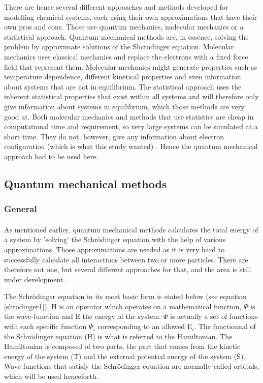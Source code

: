 \documentclass[12pt,a4paper]{article}
\begin{document}
There are hence several different approaches and methods developed for modelling chemical systems, each using their own approximations that have their own pros and cons. Those use quantum mechanics, molecular mechanics  or a statistical approach. Quantum mechanical methods are, in essence, solving the problem by approximate solutions of the Shcrödinger equation.  Molecular mechanics uses classical mechanics and replace the electrons with a fixed force field that represent  them. Molecular mechanics might generate properties such as temperature dependence, different kinetical properties and even information about systems that are not in equilibrium.  The statistical approach uses the inherent statistical properties that exist within all systems and will therefore only give information about systems in equilibrium, which those methods are very good at. Both molecular mechanics and methods that use statistics are cheap in computational time and requirement, so very large systems can be simulated at a short time. They do not, however, give any information about electron configuration (which is what this study wanted) \cite{computionalprimer}. Hence the quantum mechanical approach had to be used here.

\subsection{Quantum mechanical methods}
\subsubsection{General}
\paragraph*{}
As mentioned earlier, quantum mechanical methods calculates the total energy of a system by 'solving' the Schrödinger equation with the help of various approximations. Those approximations are needed as it is very hard to successfully calculate all interactions between two or more particles. There are therefore not one, but several different approaches for that, and the area is still under development. 

The Schrödinger equation in its most basic form is stated below (see equation \ref{shrodinger1}). H is an operator which operates on a  mathematical function, $\Psi$ is the wave-function and E the energy of the system. $\Psi$ is actually a set of functions with each specific function $\Psi_i$ corresponding to an allowed E$_i$. The functioanal  of the Schrödinger equation (H) is what is referred to the Hamiltonian. 
The Hamiltonian is composed of two parts, the part that comes from the kinetic energy of the system (\^{T}) and the external potential energy of the system (\^{S}). Wave-functions that satisfy the Schrödinger equation are normally called orbitals, which will be used  henceforth. 
\end{document}
